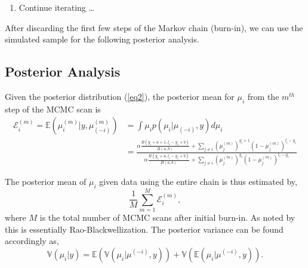 \documentclass[12pt]{amsart}
\begin{document}
{\begin{enumerate}
\item  Continue iterating \dots
\end{enumerate}

After discarding the first few steps of the Markov chain (burn-in), we can use the 
simulated sample for the following posterior analysis. 





\subsection{Posterior Analysis}
Given the posterior distribution (\ref{eq2}), the posterior mean for $\mu_{i}$ 
from the $m^{th}$ step of the MCMC scan is 
\begin{align} \label{pmean}
\mathcal{E}_{i}^{(m)}=\mathbb{E}(\mu_{i}^{(m)} | y, \mu_{(-i)}^{(m)}) & = \int \mu_{i} p(\mu_{i} | \mu_{(-i)}, y) d\mu_{i} \nonumber \\
&= \frac{\alpha \frac{B(y_{i} +a +1, l_{i}-y_{i} +b)}{B(a,b)} + \sum_{j \neq i} (\mu_{j}^{(m)}) ^{y_{i}+1} ( 1- \mu_{j}^{(m)})^{l_{i}-y_{i}}}{\alpha \frac{B(y_{i}+a, l_{i}-y_{i}+b)}{B(a,b)} + \sum_{j \neq i} (\mu_{j}^{(m)})^{y_{i}}(1-\mu_{j}^{(m)})^{l_{i}-y_{i}}} 
\end{align} 

The posterior mean of $\mu_{i}$ given data using the entire chain is thus estimated by, 
\[
\frac{1}{M}\sum_{m=1}^{M} \mathcal{E}_{i}^{(m)},
\]
where $M$ is the total number of MCMC scans after initial burn-in. 
As noted by \cite{GelfandSmith90} this is essentially Rao-Blackwellization. 
The posterior variance can be found accordingly as,  
\[
\mathbb{V}(\mu_{i} | y) = \mathbb{E}( \mathbb{V}(\mu_{i} | \mu^{(-i)}, y)) + \mathbb{V} ( \mathbb{E}(\mu_{i} | \mu^{(-i)}, y)). 
\]
\\
}
\end{document}
